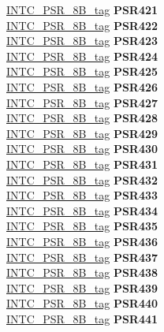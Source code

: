 \begin{DoxyCompactItemize}
\begin{tabbing}
\>\>\mbox{\hyperlink{unionINTC__PSR__8B__tag}{INTC\_PSR\_8B\_tag}} {\bfseries PSR421}\\
\>\>\mbox{\hyperlink{unionINTC__PSR__8B__tag}{INTC\_PSR\_8B\_tag}} {\bfseries PSR422}\\
\>\>\mbox{\hyperlink{unionINTC__PSR__8B__tag}{INTC\_PSR\_8B\_tag}} {\bfseries PSR423}\\
\>\>\mbox{\hyperlink{unionINTC__PSR__8B__tag}{INTC\_PSR\_8B\_tag}} {\bfseries PSR424}\\
\>\>\mbox{\hyperlink{unionINTC__PSR__8B__tag}{INTC\_PSR\_8B\_tag}} {\bfseries PSR425}\\
\>\>\mbox{\hyperlink{unionINTC__PSR__8B__tag}{INTC\_PSR\_8B\_tag}} {\bfseries PSR426}\\
\>\>\mbox{\hyperlink{unionINTC__PSR__8B__tag}{INTC\_PSR\_8B\_tag}} {\bfseries PSR427}\\
\>\>\mbox{\hyperlink{unionINTC__PSR__8B__tag}{INTC\_PSR\_8B\_tag}} {\bfseries PSR428}\\
\>\>\mbox{\hyperlink{unionINTC__PSR__8B__tag}{INTC\_PSR\_8B\_tag}} {\bfseries PSR429}\\
\>\>\mbox{\hyperlink{unionINTC__PSR__8B__tag}{INTC\_PSR\_8B\_tag}} {\bfseries PSR430}\\
\>\>\mbox{\hyperlink{unionINTC__PSR__8B__tag}{INTC\_PSR\_8B\_tag}} {\bfseries PSR431}\\
\>\>\mbox{\hyperlink{unionINTC__PSR__8B__tag}{INTC\_PSR\_8B\_tag}} {\bfseries PSR432}\\
\>\>\mbox{\hyperlink{unionINTC__PSR__8B__tag}{INTC\_PSR\_8B\_tag}} {\bfseries PSR433}\\
\>\>\mbox{\hyperlink{unionINTC__PSR__8B__tag}{INTC\_PSR\_8B\_tag}} {\bfseries PSR434}\\
\>\>\mbox{\hyperlink{unionINTC__PSR__8B__tag}{INTC\_PSR\_8B\_tag}} {\bfseries PSR435}\\
\>\>\mbox{\hyperlink{unionINTC__PSR__8B__tag}{INTC\_PSR\_8B\_tag}} {\bfseries PSR436}\\
\>\>\mbox{\hyperlink{unionINTC__PSR__8B__tag}{INTC\_PSR\_8B\_tag}} {\bfseries PSR437}\\
\>\>\mbox{\hyperlink{unionINTC__PSR__8B__tag}{INTC\_PSR\_8B\_tag}} {\bfseries PSR438}\\
\>\>\mbox{\hyperlink{unionINTC__PSR__8B__tag}{INTC\_PSR\_8B\_tag}} {\bfseries PSR439}\\
\>\>\mbox{\hyperlink{unionINTC__PSR__8B__tag}{INTC\_PSR\_8B\_tag}} {\bfseries PSR440}\\
\>\>\mbox{\hyperlink{unionINTC__PSR__8B__tag}{INTC\_PSR\_8B\_tag}} {\bfseries PSR441}\\

\end{tabbing}
\end{DoxyCompactItemize}
